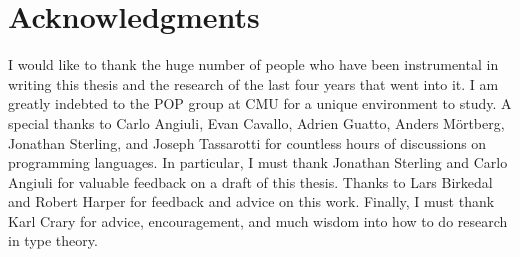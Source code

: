 \section*{Acknowledgments}

I would like to thank the huge number of people who have been
instrumental in writing this thesis and the research of the last four
years that went into it. I am greatly indebted to the POP group at CMU
for a unique environment to study. A special thanks to Carlo Angiuli,
Evan Cavallo, Adrien Guatto, Anders M{\"o}rtberg, Jonathan Sterling,
and Joseph Tassarotti for countless hours of discussions on
programming languages. In particular, I must thank Jonathan Sterling and
Carlo Angiuli for valuable feedback on a draft of this thesis. Thanks
to Lars Birkedal and Robert Harper for feedback and advice on this
work. Finally, I must thank Karl Crary for advice, encouragement, and
much wisdom into how to do research in type theory.

